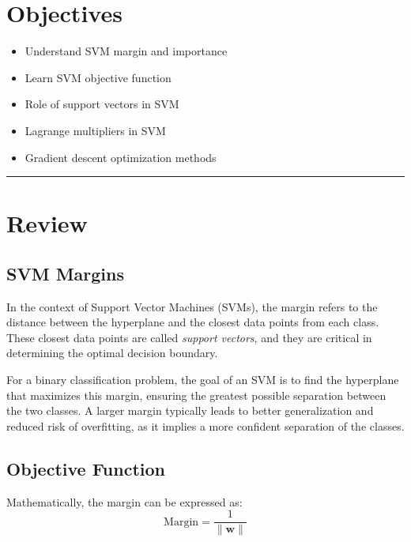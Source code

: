 
\section*{Objectives}
\begin{itemize}
    \item Understand SVM margin and importance
    \item Learn SVM objective function
    \item Role of support vectors in SVM
    \item Lagrange multipliers in SVM
    \item Gradient descent optimization methods
\end{itemize}


\rule[0.0051in]{\textwidth}{0.00025in}

\section{Review}
\subsection{SVM Margins}

In the context of Support Vector Machines (SVMs), the margin refers to the distance between the hyperplane and the closest data points from each class. These closest data points are called \textit{support vectors}, and they are critical in determining the optimal decision boundary.

For a binary classification problem, the goal of an SVM is to find the hyperplane that maximizes this margin, ensuring the greatest possible separation between the two classes. A larger margin typically leads to better generalization and reduced risk of overfitting, as it implies a more confident separation of the classes.

\subsection{Objective Function}

Mathematically, the margin can be expressed as:
\[
\text{Margin} = \frac{1}{\| \mathbf{w} \|}
\]

